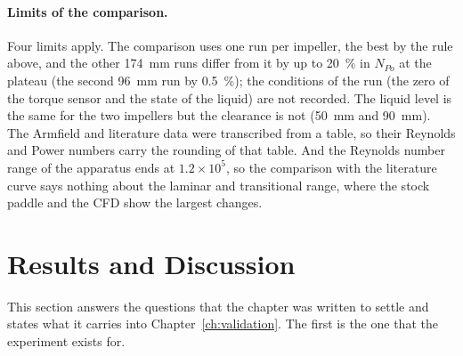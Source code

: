 \begin{table}[htbp]
    \centering
    \caption[The 96 mm data, the CFD and the Armfield data against the literature curve]{Error of the best 96~mm run, the 96~mm CFD, and the Armfield curves against the literature curve (Brown et al., curve~10), interpolated in the logarithms to the Reynolds number of each point. 96~mm run and CFD: $N_{Re}\geq4\times10^{4}$ and, for the CFD, up to the highest experimental value; Armfield: $N_{Re}\geq4000$. Bias is the mean of $(N_{Po} - N_{Po,\mathrm{lit}})/N_{Po,\mathrm{lit}}$.}
    \label{tab:rmse-lit}
    \small
    \resizebox{\textwidth}{!}{}
\end{table}

\paragraph{Limits of the comparison.}
Four limits apply. The comparison uses one run per impeller, the best by the rule above, and the other 174~mm runs differ from it by up to 20~\% in $N_{Po}$ at the plateau (the second 96~mm run by 0.5~\%); the conditions of the run (the zero of the torque sensor and the state of the liquid) are not recorded. The liquid level is the same for the two impellers but the clearance is not (50~mm and 90~mm). The Armfield and literature data were transcribed from a table, so their Reynolds and Power numbers carry the rounding of that table. And the Reynolds number range of the apparatus ends at $1.2\times10^{5}$, so the comparison with the literature curve says nothing about the laminar and transitional range, where the stock paddle and the CFD show the largest changes.


\section{Results and Discussion}
\label{sec:agit-discussion}

This section answers the questions that the chapter was written to settle and states what it carries into Chapter~\ref{ch:validation}. The first is the one that the experiment exists for.

